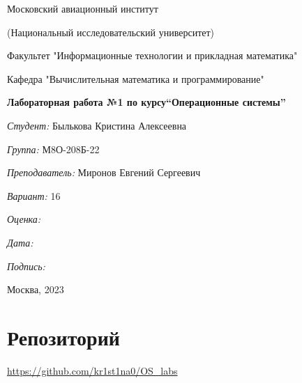 \documentclass[a4paper, 12pt]{article}
\begin{document}
\thispagestyle{empty}	
\begin{center}
	Московский авиационный институт
	
	(Национальный исследовательский университет)
	
	Факультет "Информационные технологии и прикладная математика"
	
	Кафедра "Вычислительная математика и программирование"
	
\end{center}
\vspace{40ex}
\begin{center}
	\textbf{\large{Лабораторная работа №1 по курсу\linebreak \textquotedblleft Операционные системы\textquotedblright}}
\end{center}
\vspace{35ex}
\begin{flushright}
	\textit{Студент: } Былькова Кристина Алексеевна
	
	\vspace{2ex}
	\textit{Группа: } М8О-208Б-22
	
	\vspace{2ex}
	\textit{Преподаватель: } Миронов Евгений Сергеевич
	
	\vspace{2ex}
	\textit{Вариант: } 16 
	
	\vspace{2ex}
	\textit{Оценка: } \underline{\quad\quad\quad\quad\quad\quad}
	
	 \vspace{2ex}
	\textit{Дата: } \underline{\quad\quad\quad\quad\quad\quad}
	
	\vspace{2ex}
	\textit{Подпись: } \underline{\quad\quad\quad\quad\quad\quad}
	
\end{flushright}

\vspace{5ex}

\begin{vfill}
	\begin{center}
		Москва, 2023
	\end{center}	
\end{vfill}
\newpage


\begingroup
\color{black}
\tableofcontents\newpage
\endgroup

\section{Репозиторий}
\href{https://github.com/kr1st1na0/OS\_labs}{https://github.com/kr1st1na0/OS\_labs}
\end{document}
